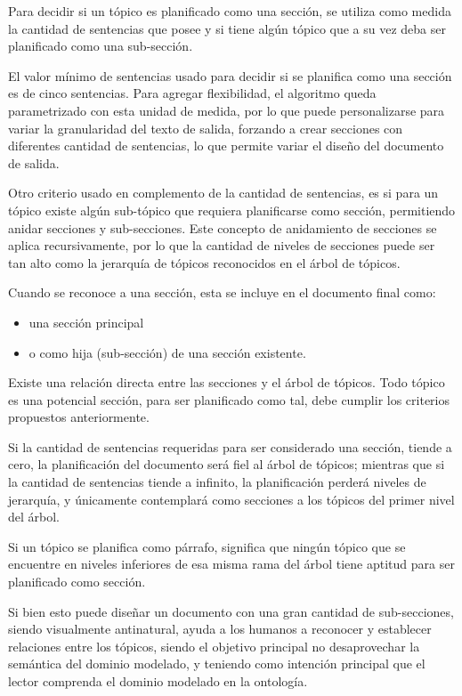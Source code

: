 Para decidir si un tópico es planificado como una sección, se utiliza como medida la cantidad de sentencias que posee y si tiene algún tópico que a su vez deba ser planificado como una sub-sección.

El valor mínimo de sentencias usado para decidir si se planifica como una sección es de cinco sentencias. Para agregar flexibilidad, el algoritmo queda parametrizado con esta unidad de medida, por lo que puede personalizarse para variar la granularidad del texto de salida, forzando a crear secciones con diferentes cantidad de sentencias, lo que permite variar el diseño del documento de salida.

Otro criterio usado en complemento de la cantidad de sentencias, es si para un tópico existe algún sub-tópico que requiera planificarse como sección, permitiendo anidar secciones y sub-secciones. Este concepto de anidamiento de secciones se aplica recursivamente, por lo que la cantidad de niveles de secciones puede ser tan alto como la jerarquía de tópicos reconocidos en el árbol de tópicos. 

Cuando se reconoce a una sección, esta se incluye en el documento final como: \begin{itemize}
    \item una sección principal
    \item o como hija (sub-sección) de una sección existente.
\end{itemize}

Existe una relación directa entre las secciones y el árbol de tópicos. Todo tópico es una potencial sección, para ser planificado como tal, debe cumplir los criterios propuestos anteriormente. 

Si la cantidad de sentencias requeridas para ser considerado una sección, tiende a cero, la planificación del documento será fiel al árbol de tópicos; mientras que si la cantidad de sentencias tiende a infinito, la planificación perderá niveles de jerarquía, y únicamente contemplará como secciones a los tópicos del primer nivel del árbol.   

Si un tópico se planifica como párrafo, significa que ningún tópico que se encuentre en niveles inferiores de esa misma rama del árbol tiene aptitud para ser planificado como sección.

Si bien esto puede diseñar un documento con una gran cantidad de sub-secciones, siendo visualmente antinatural, ayuda a los humanos a reconocer y establecer relaciones entre los tópicos, siendo el objetivo principal no desaprovechar la semántica del dominio modelado, y teniendo como intención principal que el lector comprenda el dominio modelado en la ontología.

